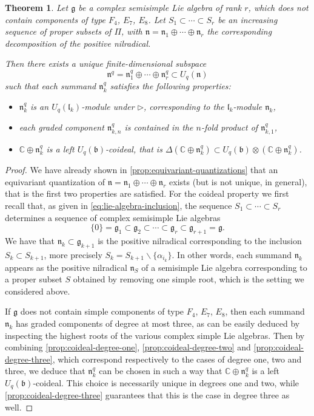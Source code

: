 \documentclass[a4paper, 12pt, reqno, english]{amsart}
\numberwithin{equation}{section}
\numberwithin{figure}{section}
\theoremstyle{plain}
\newtheorem{theorem}{Theorem}[section]
\theoremstyle{plain}
\theoremstyle{plain}
\theoremstyle{plain}
\theoremstyle{plain}
\theoremstyle{definition}
\theoremstyle{definition}
\theoremstyle{definition}
\theoremstyle{remark}
\theoremstyle{definition}
\theoremstyle{definition}
\newcommand{\Uqb}{U_q(\mathfrak{b})}
\newcommand{\Uqn}{U_q(\mathfrak{n})}
\newcommand{\bbC}{\mathbb{C}}
\newcommand{\lieg}{\mathfrak{g}}
\newcommand{\liel}{\mathfrak{l}}
\newcommand{\lien}{\mathfrak{n}}
\newcommand{\simpleroots}{\Pi}
\newcommand{\qnil}{\lien^q}
\begin{document}
\begin{theorem}
\label{thm:coideal-quantizations}
Let $\lieg$ be a complex semisimple Lie algebra of rank $r$, which does not contain components of type $F_4$, $E_7$, $E_8$.
Let $S_1 \subset \cdots \subset S_r$ be an increasing sequence of proper subsets of $\simpleroots$, with $\lien = \lien_1 \oplus \cdots \oplus \lien_r$ the corresponding decomposition of the positive nilradical.

Then there exists a unique finite-dimensional subspace
\[
\qnil = \qnil_1 \oplus \cdots \oplus \qnil_r \subset \Uqn
\]
such that each summand $\qnil_k$ satisfies the following properties:
\begin{itemize}
\item $\qnil_k$ is an $U_q(\liel_k)$-module under $\triangleright$, corresponding to the $\liel_k$-module $\lien_k$,
\item each graded component $\qnil_{k, n}$ is contained in the $n$-fold product of $\qnil_{k, 1}$,
\item $\bbC \oplus \qnil_k$ is a left $\Uqb$-coideal, that is $\Delta(\bbC \oplus \qnil_k) \subset \Uqb \otimes (\bbC \oplus \qnil_k)$.
\end{itemize}
\end{theorem}

\begin{proof}
We have already shown in \cref{prop:equivariant-quantizations} that an equivariant quantization of $\lien = \lien_1 \oplus \cdots \oplus \lien_r$ exists (but is not unique, in general), that is the first two properties are satisfied.
For the coideal property we first recall that, as given in \eqref{eq:lie-algebra-inclusion}, the sequence $S_1 \subset \cdots \subset S_r$ determines a sequence of complex semisimple Lie algebras
\[
\{0\} = \lieg_1 \subset \lieg_2 \subset \cdots \subset \lieg_r \subset \lieg_{r + 1} = \lieg.
\]
We have that $\lien_k \subset \lieg_{k + 1}$ is the positive nilradical corresponding to the inclusion $S_k \subset S_{k + 1}$, more precisely $S_k = S_{k + 1} \backslash \{ \alpha_{i_k} \}$.
In other words, each summand $\lien_k$ appears as the positive nilradical $\lien_S$ of a semisimple Lie algebra corresponding to a proper subset $S$ obtained by removing one simple root, which is the setting we considered above.

If $\lieg$ does not contain simple components of type $F_4$, $E_7$, $E_8$, then each summand $\lien_k$ has graded components of degree at most three, as can be easily deduced by inspecting the highest roots of the various complex simple Lie algebras.
Then by combining \cref{prop:coideal-degree-one}, \cref{prop:coideal-degree-two} and \cref{prop:coideal-degree-three}, which correspond respectively to the cases of degree one, two and three, we deduce that $\qnil_k$ can be chosen in such a way that $\bbC \oplus \qnil_k$ is a left $\Uqb$-coideal.
This choice is necessarily unique in degrees one and two, while \cref{prop:coideal-degree-three} guarantees that this is the case in degree three as well.
\end{proof}
\end{document}
